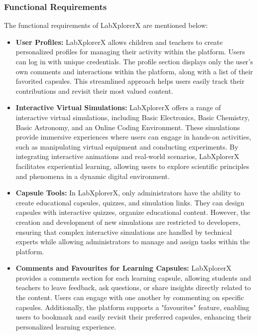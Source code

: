 \subsubsection{Functional Requirements}The functional requirements of LabXplorerX are mentioned below:
\begin{itemize}
    \item \textbf{User Profiles:}  
    LabXplorerX allows children and teachers to create personalized profiles for managing their activity within the platform. Users can log in with unique credentials. The profile section displays only the user's own comments and interactions within the platform, along with a list of their favorited capsules. This streamlined approach helps users easily track their contributions and revisit their most valued content.

    \item \textbf{Interactive Virtual Simulations:} LabXplorerX offers a range of interactive virtual simulations, including Basic Electronics, Basic Chemistry, Basic Astronomy, and an Online Coding Environment. These simulations provide immersive experiences where users can engage in hands-on activities, such as manipulating virtual equipment and conducting experiments. By integrating interactive animations and real-world scenarios, LabXplorerX facilitates experiential learning, allowing users to explore scientific principles and phenomena in a dynamic digital environment.

    \item \textbf{Capsule Tools:}  
    In LabXplorerX, only administrators have the ability to create educational capsules, quizzes, and simulation links. They can design capsules with interactive quizzes, organize educational content. However, the creation and development of new simulations are restricted to developers, ensuring that complex interactive simulations are handled by technical experts while allowing administrators to manage and assign tasks within the platform.
    

    \item \textbf{Comments and Favourites for Learning Capsules:}  
    LabXplorerX provides a comments section for each learning capsule, allowing students and teachers to leave feedback, ask questions, or share insights directly related to the content. Users can engage with one another by commenting on specific capsules. Additionally, the platform supports a "favourites" feature, enabling users to bookmark and easily revisit their preferred capsules, enhancing their personalized learning experience.



\end{itemize}

